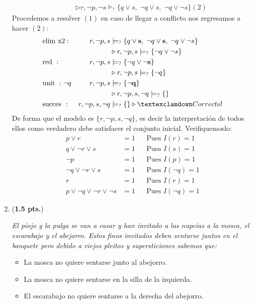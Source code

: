 \documentclass[11pt,letterpaper]{article}
\begin{document}
\begin{enumerate}
\begin{align*}
    & & &\triangleright r, \neg p, \neg s \models_? \{q\lor s,\;\neg q\lor s,\;\neg q\lor\neg s\}(2)
  \end{align*}
  Procedemos a resolver $(1)$ en caso de llegar a conflicto nos regresamos a hacer $(2)$:
  \begin{align*}
    &\text{elim x2}: & r, \neg p, s &\models_? \{q\lor {\bf s},\;\neg q\lor {\bf s},\;\neg q\lor\neg s\} \\
    & & &\triangleright r, \neg p, s \models_? \{\neg q\lor\neg s\} \\
    &\text{red }: & r, \neg p, s &\models_? \{\neg q\lor{\bf \neg s}\} \\
    & & &\triangleright r, \neg p, s \models_? \{\neg q\}\\
    &\text{unit }:\neg q & r, \neg p, s &\models_? \{{\bf \neg q}\}\\
    & & &\triangleright r, \neg p, s, \neg q \models_? \{\}\\
    &\text{succes }: & r, \neg p, s, \neg q &\models_? \{\} \triangleright ¡Correcto!
  \end{align*}
  De forma que el modelo es $\{r, \neg p, s, \neg q \}$, es decir la interpretación de todos ellos como verdadero debe satisfacer el conjunto inicial. Verifiquemoslo:
  \begin{align*}
    p\lor r &= 1 & &\text{Pues } I(r) = 1\\
    q\lor\neg r\lor s &= 1 & &\text{Pues } I(s) = 1\\
    \neg p&=1 & &\text{Pues }I(p) = 1\\
    \neg q\lor\neg r\lor s &= 1 & &\text{Pues }I(\neg q) = 1\\
    r &= 1 & &\text{Pues } I(r) = 1\\
    p\lor\neg q\lor \neg r\lor\neg s &= 1 & &\text{Pues }I(\neg q) = 1
  \end{align*}
\item(\textbf{1.5 pts.}) {\it El piojo y la pulga se van a casar y han invitado a las nupcias a la mosca, el escarabajo y el abejorro. Estos finos invitados deben sentarse juntos en el banquete pero debido a viejos pleitos y supersticiones sabemos que:

  \begin{itemize} 
    \item La mosca no quiere sentarse junto al abejorro.
    \item La mosca no quiere sentarse en la silla de la izquierda.
    \item El escarabajo no quiere sentarse a la derecha del abejorro.
    \end{itemize}}
 

\end{enumerate}
\end{document}
